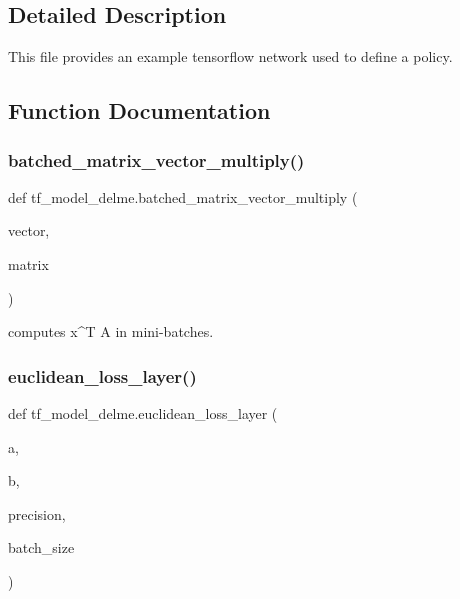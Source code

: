 \subsection{Detailed Description}
\begin{DoxyVerb}This file provides an example tensorflow network used to define a policy. \end{DoxyVerb}
 

\subsection{Function Documentation}
\hypertarget{namespacetf__model__delme_a49d3580d15c8b935b0d77a7ec7afa2f5}{}\label{namespacetf__model__delme_a49d3580d15c8b935b0d77a7ec7afa2f5} 
\subsubsection{\texorpdfstring{batched\+\_\+matrix\+\_\+vector\+\_\+multiply()}{batched\_matrix\_vector\_multiply()}}
{\footnotesize\ttfamily def tf\+\_\+model\+\_\+delme.\+batched\+\_\+matrix\+\_\+vector\+\_\+multiply (\begin{DoxyParamCaption}\item[{}]{vector,  }\item[{}]{matrix }\end{DoxyParamCaption})}

\begin{DoxyVerb}computes x^T A in mini-batches. \end{DoxyVerb}
 \hypertarget{namespacetf__model__delme_a5aa99342556074aff93e73f11413fb72}{}\label{namespacetf__model__delme_a5aa99342556074aff93e73f11413fb72} 
\subsubsection{\texorpdfstring{euclidean\+\_\+loss\+\_\+layer()}{euclidean\_loss\_layer()}}
{\footnotesize\ttfamily def tf\+\_\+model\+\_\+delme.\+euclidean\+\_\+loss\+\_\+layer (\begin{DoxyParamCaption}\item[{}]{a,  }\item[{}]{b,  }\item[{}]{precision,  }\item[{}]{batch\+\_\+size }\end{DoxyParamCaption})}

